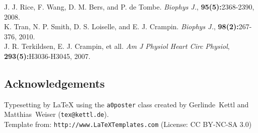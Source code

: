 \documentclass[a0,portrait]{a0poster}
\begin{document}
\begin{multicols}{2}
J. J. Rice, F. Wang, D. M. Bers, and P. de Tombe. \textit{Biophys J.}, \textbf{95(5):}2368-2390, 2008.\\
K. Tran, N. P. Smith, D. S. Loiselle, and E. J. Crampin. \textit{Biophys J.}, \textbf{98(2):}267-376, 2010.\\
J. R. Terkildsen, E. J. Crampin, et all. \textit{Am J Physiol Heart Circ Physiol}, \textbf{293(5):}H3036-H3045, 2007.



\subsection*{Acknowledgements}

\small{Typesetting by {\LaTeX} using the \texttt{a0poster} class
created by Gerlinde~Kettl and Matthias~Weiser (\texttt{tex@kettl.de}).\\
Template from: \texttt{http://www.LaTeXTemplates.com} (License: CC BY-NC-SA 3.0)}


\end{multicols}
\end{document}
